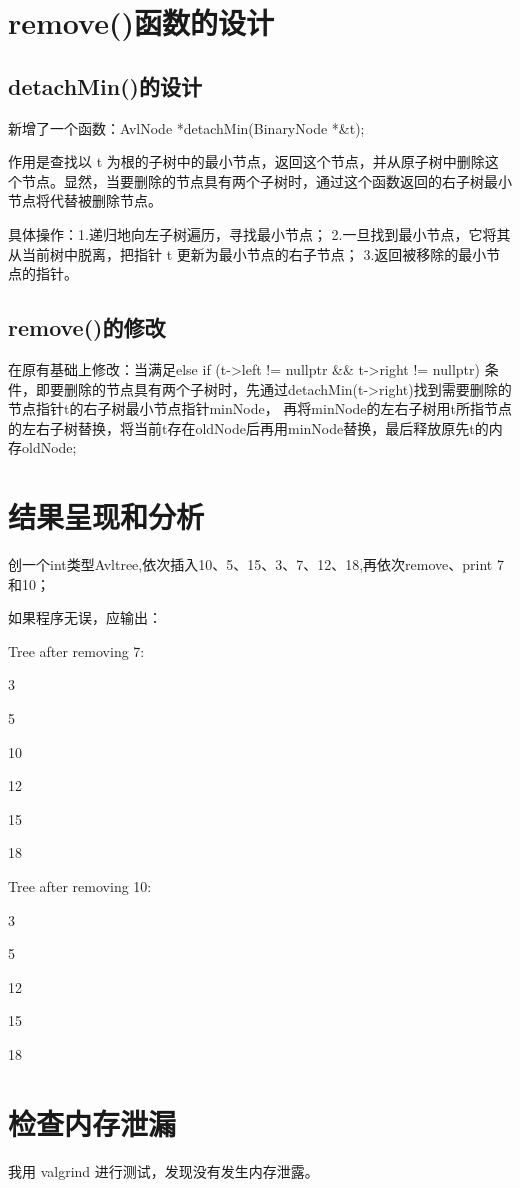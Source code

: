 \documentclass[UTF8]{ctexart}
\begin{document}
\pagestyle{fancy}
\fancyhead{}

\section{remove()函数的设计}

\subsection{detachMin()的设计}
新增了一个函数：AvlNode *detachMin(BinaryNode *\&t);

作用是查找以 t 为根的子树中的最小节点，返回这个节点，并从原子树中删除这个节点。显然，当要删除的节点具有两个子树时，通过这个函数返回的右子树最小节点将代替被删除节点。


具体操作：1.递归地向左子树遍历，寻找最小节点；
2.一旦找到最小节点，它将其从当前树中脱离，把指针 t 更新为最小节点的右子节点；
3.返回被移除的最小节点的指针。


\subsection{remove()的修改}
在原有基础上修改：当满足else if (t->left != nullptr \&\& t->right != nullptr) 条件，即要删除的节点具有两个子树时，先通过detachMin(t->right)找到需要删除的节点指针t的右子树最小节点指针minNode，
再将minNode的左右子树用t所指节点的左右子树替换，将当前t存在oldNode后再用minNode替换，最后释放原先t的内存oldNode;

\section{结果呈现和分析}
创一个int类型Avltree,依次插入10、5、15、3、7、12、18,再依次remove、print 7和10；

如果程序无误，应输出：

Tree after removing 7:

3

5

10

12

15

18

Tree after removing 10:

3

5

12

15

18

\section{检查内存泄漏}

我用 valgrind 进行测试，发现没有发生内存泄露。
\end{document}
